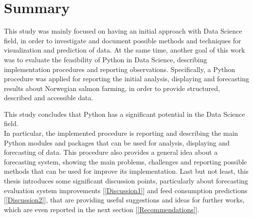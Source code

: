 
\section{Summary}

This study was mainly focused on having an initial approach with Data Science field, in order to investigate and document possible methods and techniques for visualization and prediction of data. At the same time, another goal of this work was to evaluate the feasibility of Python in Data Science, describing implementation procedures and reporting observations.
Specifically, a Python procedure was applied for reporting the initial analysis, displaying and forecasting results about Norwegian salmon farming, in order to provide structured, described and accessible data.

This study concludes that Python has a significant potential in the Data Science field. \\ In particular, the implemented procedure is reporting and describing the main Python modules and packages that can be used for analysis, displaying and forecasting of data. This procedure also provides a general idea about a forecasting system, showing the main problems, challenges and reporting possible methods that can be used for improve its implementation. 
Last but not least, this thesis introduces some significant discussion points, particularly about forecasting evaluation system improvements [\ref{Discussion1}] and feed consumption predictions [\ref{Discussion2}], that are providing useful suggestions and ideas for further works, which are even reported in the next section [\ref{Recommendations}].

\newpage
